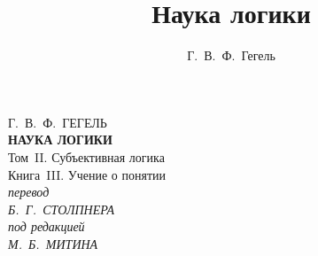 \documentclass[b5paper, 11pt, twoside, onecolumn, openany]{memoir}
\author{Г.~В.~Ф.~Гегель}
\title{Наука логики}
\date{}
\begin{document}
\frontmatter
\pagestyle{empty}

\begin{center}
  {\Large Г.~В.~Ф.~ГЕГЕЛЬ} \\
  \vspace{130pt}
  \textbf{\Huge НАУКА ЛОГИКИ} \\
  \vspace{12pt}
  {\Large Том~II. Субъективная логика} \\
  \vspace{8pt}
  {\large Книга~III. Учение о понятии} \\
  \vspace{45pt}
  \textit{перевод} \\
  \textit{Б.~Г.~СТОЛПНЕРА} \\
  \vspace{10pt}
  \textit{под редакцией} \\
  \textit{М.~Б.~МИТИНА}
\end{center}

\clearpage

\mainmatter
\pagestyle{plain}



\backmatter

\clearpage
\tableofcontents*
\clearpage
\end{document}
